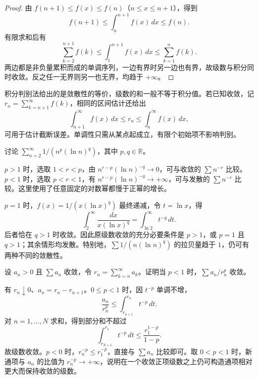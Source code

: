 \documentclass[UTF8,12pt,a4paper,fontset=fandol]{ctexbook}
\begin{document}
\begin{proof}
由 $f(n+1)\leq f(x)\leq f(n)$（$n\leq x\leq n+1$），得到
\[
    f(n+1)\leq\int_n^{n+1}f(x)\,dx\leq f(n).
\]
有限求和后有
\begin{equation}
    \sum_{k=2}^{n+1}f(k)
    \leq\int_1^{n+1}f(x)\,dx
    \leq\sum_{k=1}^n f(k).
    \label{eq:series-integral-comparison}
\end{equation}
两边都是非负量累积而成的单调序列，一边有界时另一边也有界，故级数与积分同时收敛。反之任一无界则另一也无界，均趋于 $+\infty$。
\end{proof}

积分判别法给出的是敛散性的等价，级数的和一般不等于积分值。若已知收敛，记 $r_n=\sum_{k=n+1}^{\infty}f(k)$，相同的区间估计还给出
\begin{equation}
    \int_{n+1}^{\infty}f(x)\,dx\leq r_n
       \leq\int_n^{\infty}f(x)\,dx,
    \label{eq:integral-test-series-tail-bound}
\end{equation}
可用于估计截断误差。单调性只需从某点起成立，有限个初始项不影响判别。

\begin{example}
\label{ex:logarithmic-p-series}
讨论 $\sum_{n=2}^{\infty}1/(n^p(\ln n)^q)$，其中 $p,q\in\mathbb R$。
\end{example}

\begin{solve}
$p>1$ 时，选取 $1<r<p$，由 $n^{r-p}(\ln n)^{-q}\to0$，可与收敛的 $\sum n^{-r}$ 比较。$p<1$ 时，选取 $p<r<1$，有 $n^{r-p}(\ln n)^{-q}\to+\infty$，可与发散的 $\sum n^{-r}$ 比较。这里使用了任意固定的对数幂都慢于正幂的增长。

$p=1$ 时，$f(x)=1/(x(\ln x)^q)$ 最终递减，令 $t=\ln x$，得
\[
    \int_2^{\infty}\frac{dx}{x(\ln x)^q}
      =\int_{\ln2}^{\infty}t^{-q}\,dt.
\]
后者恰在 $q>1$ 时收敛。因此原级数收敛的充分必要条件是 $p>1$，或 $p=1$ 且 $q>1$；其余情形均发散。特别地，$\sum1/(n(\ln n)^q)$ 的拉贝量趋于 $1$，仍可有两种不同的敛散性。
\end{solve}

\begin{example}
\label{ex:positive-series-tail-powered-denominator}
设 $a_n>0$ 且 $\sum a_n$ 收敛，令 $r_n=\sum_{k=n}^{\infty}a_k$。证明当 $p<1$ 时，$\sum a_n/r_n^p$ 收敛。
\end{example}

\begin{solve}
有 $r_n\downarrow0$、$a_n=r_n-r_{n+1}$。$0\leq p<1$ 时，因 $t^{-p}$ 单调不增，
\[
    \frac{a_n}{r_n^p}
      \leq\int_{r_{n+1}}^{r_n}t^{-p}\,dt.
\]
对 $n=1,\ldots,N$ 求和，得到部分和不超过
\[
    \int_{r_{N+1}}^{r_1}t^{-p}\,dt
      \leq\frac{r_1^{1-p}}{1-p}.
\]
故级数收敛。$p<0$ 时，$r_n^{-p}\leq r_1^{-p}$，直接与 $\sum a_n$ 比较即可。取 $0<p<1$ 时，新通项与 $a_n$ 的比值为 $r_n^{-p}\to+\infty$，说明在一个收敛正项级数之上仍可构造通项相对更大而保持收敛的级数。
\end{solve}
\end{document}
